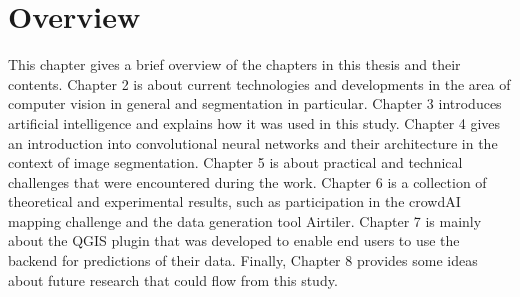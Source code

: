 
\chapter{Overview}\label{chp:overview}
This chapter gives a brief overview of the chapters in this thesis and their contents. Chapter 2 is about current technologies and developments in the area of computer vision in general and segmentation in particular. Chapter 3 introduces artificial intelligence and explains how it was used in this study. Chapter 4 gives an introduction into convolutional neural networks and their architecture in the context of image segmentation. Chapter 5 is about practical and technical challenges that were encountered during the work. Chapter 6 is a collection of theoretical and experimental results, such as participation in the crowdAI mapping challenge and the data generation tool Airtiler. Chapter 7 is mainly about the QGIS plugin that was developed to enable end users to use the backend for predictions of their data. Finally, Chapter 8 provides some ideas about future research that could flow from this study.
